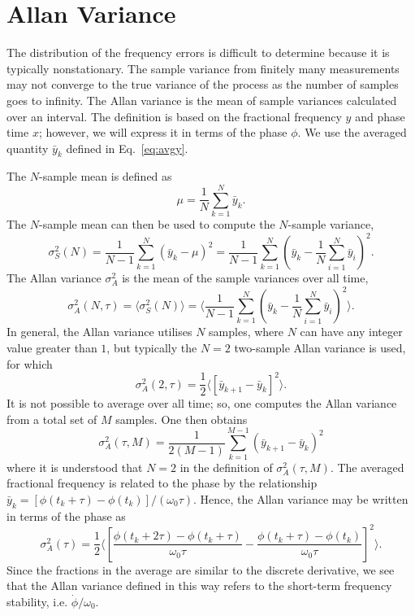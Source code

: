\section{Allan Variance} \label{sec:avar}

The distribution of the frequency errors is difficult to determine because it is typically nonstationary.  The sample variance from finitely many measurements may not converge to the true variance of the process as the number of samples goes to infinity. The Allan variance is the mean of sample variances calculated over an interval. The definition is based on the fractional frequency $y$ and phase time $x$; however, we will express it in terms of the phase $\phi$. We use the averaged quantity $\bar{y}_k$ defined in Eq.~\ref{eq:avgy}.

The $N$-sample mean is defined as
%
\begin{equation}
\mu = \frac{1}{N} \sum_{k=1}^{N} \bar{y}_k.
\end{equation}
%
The $N$-sample mean can then be used to compute the $N$-sample variance,
%
\begin{equation}
\sigma_S^2(N) = \frac{1}{N-1} \sum_{k=1}^{N} \left(\bar{y}_k - \mu\right)^2 = \frac{1}{N-1} \sum_{k=1}^{N} \left(\bar{y}_k - \frac{1}{N} \sum_{i=1}^{N} \bar{y}_i\right)^2.
\end{equation}
%
The Allan variance $\sigma^2_A$ \cite{Allan1974} is the mean of the sample variances over all time,
%
\begin{equation}
\sigma_A^2(N,\tau) = \langle \sigma_S^2(N) \rangle = \bigg\langle \frac{1}{N-1} \sum_{k=1}^{N} \left(\bar{y}_k - \frac{1}{N} \sum_{i=1}^{N} \bar{y}_i\right)^2 \bigg\rangle.
\end{equation}
%
In general, the Allan variance utilises $N$ samples, where $N$ can have any integer value greater than $1$, but typically the $N=2$ two-sample Allan variance is used, for which
%
\begin{equation} \label{eq:2sallan}
\sigma_A^2(2, \tau) = \frac{1}{2}\langle [\bar{y}_{k+1} - \bar{y}_{k}]^2 \rangle.
\end{equation}
%
It is not possible to average over all time; so, one computes the Allan variance from a total set of $M$ samples. One then obtains
%
\begin{equation}
\sigma_A^2(\tau,M) = \frac{1}{2(M-1)}\sum_{k=1}^{M-1} \left(\bar{y}_{k+1} - \bar{y}_{k}\right)^2
\end{equation}
%
where it is understood that $N=2$ in the definition of $\sigma_A^2(\tau,M)$.
The averaged fractional frequency is related to the phase by the relationship $\bar{y}_k = [\phi(t_k+\tau) - \phi(t_k)]/(\omega_0\tau)$. Hence, the Allan variance may be written in terms of the phase as
% 
\begin{equation} \label{eq:phiallan}
\sigma_A^2(\tau) = \frac{1}{2}\bigg\langle \left[\frac{\phi(t_k+2\tau) - \phi(t_k+\tau)}{\omega_0\tau} - \frac{\phi(t_k+\tau) - \phi(t_k)}{\omega_0\tau}\right]^2 \bigg\rangle.
\end{equation}
Since the fractions in the average are similar to the discrete derivative, we see that the Allan variance defined in this way refers to the short-term frequency stability, i.e. $\dot{\phi}/\omega_0$.

